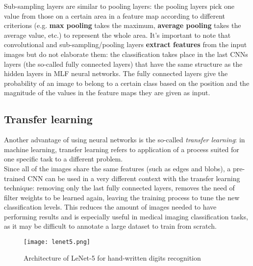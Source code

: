 \documentclass[../main.tex]{subfiles}
\begin{document}
Sub-sampling layers are similar to pooling layers: the pooling layers pick one value from those on a certain area in a feature map according to different criterions (e.g. \textbf{max pooling} takes the maximum, \textbf{average pooling} takes the average value, etc.) to represent the whole area. 
It's important to note that convolutional and sub-sampling/pooling layers \textbf{extract features} from the input images but do not elaborate them: the classification takes place in the last CNNs layers (the so-called fully connected layers) that have the same structure as the hidden layers in MLF neural networks. 
The fully connected layers give the probability of an image to belong to a certain class based on the position and the magnitude of the values in the feature maps they are given as input. \\ 


\subsection{Transfer learning}
Another advantage of using neural networks is the so-called \textit{transfer learning}: in machine learning, transfer learning refers to application of a process suited for one specific task to a different problem. \cite{Lakhani2018} \\ Since all of the images share the same features (such as edges and blobs), a pre-trained CNN can be used in a very different context with the transfer learning technique: removing only the last fully connected layers, removes the need of filter weights to be learned again, leaving the training process to tune the new classification levels. This reduces the amount of images needed to have performing results and is especially useful in medical imaging classification tasks, as it may be difficult to annotate a large dataset to train from scratch. \cite{Lakhani2018} 

\clearpage
\newpage 

\begin{figure}[H]
  \centering
  \texttt{[image: lenet5.png]}
  \caption{Architecture of LeNet-5 for hand-written digits recognition \cite{LeCun1998}}
  \label{fig:lenet5}
\end{figure}
\end{document}
